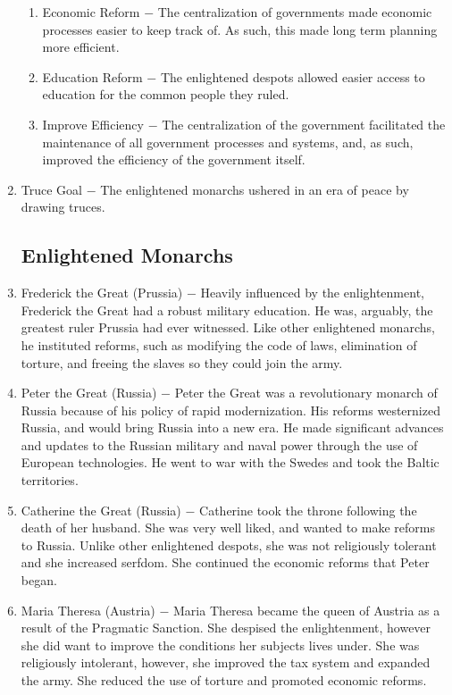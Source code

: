 \documentclass[12pt]{article}
\begin{document}
\begin{enumerate}
\begin{enumerate}[label=\arabic{*}.]
\item Economic Reform $-$ The centralization of governments made economic processes easier to keep track of. As such, this made long term planning more efficient.

\item Education Reform $-$ The enlightened despots allowed easier access to education for the common people they ruled.

\item Improve Efficiency $-$ The centralization of the government facilitated the maintenance of all government processes and systems, and, as such, improved the efficiency of the government itself.


\end{enumerate}
\setcounter{enumi}{283}

\item Truce Goal $-$ The enlightened monarchs ushered in an era of peace by drawing truces. 

\subsection{Enlightened Monarchs}

\item Frederick the Great (Prussia) $-$ Heavily influenced by the enlightenment, Frederick the Great had a robust military education. He was, arguably, the greatest ruler Prussia had ever witnessed. Like other enlightened monarchs, he instituted reforms, such as modifying the code of laws, elimination of torture, and freeing the slaves so they could join the army.

\item Peter the Great (Russia) $-$ Peter the Great was a revolutionary monarch of Russia because of his policy of rapid modernization. His reforms westernized Russia, and would bring Russia into a new era. He made significant advances and updates to the Russian military and naval power through the use of European technologies. He went to war with the Swedes and took the Baltic territories.

\item Catherine the Great (Russia) $-$ Catherine took the throne following the death of her husband. She was very well liked, and wanted to make reforms to Russia. Unlike other enlightened despots, she was not religiously tolerant and she increased serfdom. She continued the economic reforms that Peter began.

\item Maria Theresa (Austria) $-$ Maria Theresa became the queen of Austria as a result of the Pragmatic Sanction. She despised the enlightenment, however she did want to improve the conditions her subjects lives under. She was religiously intolerant, however, she improved the tax system and expanded the army. She reduced the use of torture and promoted economic reforms.


\end{enumerate}
\end{document}
